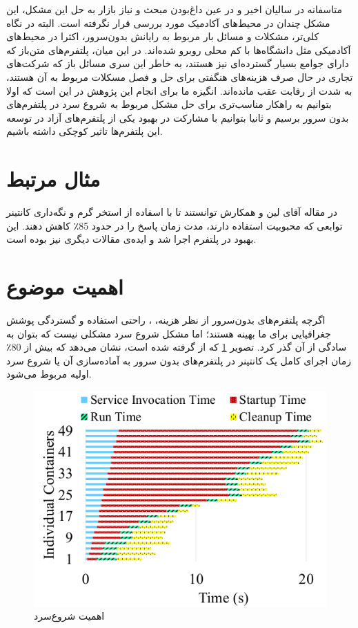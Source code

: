 \par
متاسفانه در سالیان اخیر و در عین داغ‌بودن مبحث و نیاز بازار به حل این مشکل، این مشکل چندان در محیط‌های آکادمیک مورد بررسی قرار نگرفته است. البته در نگاه کلی‌تر، مشکلات و مسائل بار مربوط به رایانش بدون‌سرور، اکثرا در محیط‌های آکادمیکی مثل دانشگاه‌ها با کم محلی روبرو شده‌اند. در این میان، پلتفرم‌های متن‌باز که دارای جوامع بسیار گسترده‌ای نیز هستند، به خاطر این سری مسائل باز که شرکت‌‌های تجاری در حال صرف هزینه‌های هنگفتی برای حل و فصل مسکلات مربوط‌ به آن‌ هستند، به شدت از رقابت عقب مانده‌اند. انگیزه ما برای انجام این پژوهش در این است که اولا بتوانیم به راهکار مناسب‌تری برای حل مشکل مربوط به شروع سرد در پلتفرم‌های بدون سرور برسیم و ثانیا بتوانیم با مشارکت در بهبود یکی از پلتفرم‌های آزاد در توسعه این پلتفرم‌ها تاثیر کوچکی داشته باشیم. 


\section{مثال مرتبط}
\par

در مقاله \cite{lin2019mitigating} آقای لین و همکارش توانستند تا با اسفاده از استخر گرم و نگه‌داری کانتینر توابعی که محبوبیت استفاده دارند، مدت زمان پاسخ را در حدود 85٪ کاهش دهند. این بهبود در پلتفرم  اجرا شد و ایده‌ی مقالات دیگری نیز بوده است.

\section{اهمیت موضوع}
\par 

اگرچه پلتفرم‌های بدون‌سرور از نظر هزینه، ، راحتی استفاده و گستردگی پوشش جغرافیایی برای ما بهینه هستند؛ اما مشکل شروع سرد مشکلی نیست که بتوان به سادگی از آن گذر کرد. 
تصویر \ref{fig:coldstart-importance} که از \cite{mohan2019agile} گرفته شده است، نشان می‌دهد که بیش از 80٪ زمان اجرای کامل یک کانتینر در پلتفرم‌های بدون سرور به آماده‌سازی آن یا شروع سرد اولیه مربوط می‌شود. 

\begin{figure}
	\centering
	\includegraphics[width=\linewidth]{figs/coldstart-importance}
	\caption {اهمیت شروع‌سرد}
	\label{fig:coldstart-importance}
\end{figure}

